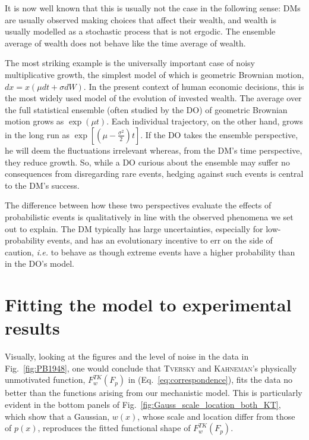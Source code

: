 \documentclass[a4paper, 12pt]{article}
\newcommand{\person}[1]{\textsc{#1}\xspace}
\newcommand{\eref}[1]{(Eq.~\ref{eq:#1})}
\newcommand{\fref}[1]{Fig.~\ref{fig:#1}}
\newcommand{\seclabel}[1]{\label{sec:#1}}
\newcommand{\ie}{\textit{i.e.}\xspace}
\begin{document}
It is now well known that this is usually not the case in the following sense: DMs are usually observed making choices that affect their wealth, and wealth is usually modelled as a stochastic process that is not ergodic. The ensemble average of wealth does not behave like the time average of wealth.

The most striking example is the universally important case of noisy multiplicative growth, the simplest model of which is geometric Brownian motion, $dx=x(\mu dt+\sigma dW)$. In the present context of human economic decisions, this is the most widely used model of the evolution of invested wealth. The average over the full statistical ensemble (often studied by the DO) of geometric Brownian motion grows as $\exp(\mu t)$. Each individual trajectory, on the other hand, grows in the long run as $\exp[(\mu-\frac{\sigma^2}{2})t]$. If the DO takes the ensemble perspective, he will deem the fluctuations irrelevant whereas, from the DM's time perspective, they reduce growth. So, while a DO curious about the ensemble may suffer no consequences from disregarding rare events, hedging against such events is central to the DM's success.

The difference between how these two perspectives evaluate the effects of probabilistic events is qualitatively in line with the observed phenomena we set out to explain. The DM typically has large uncertainties, especially for low-probability events, and has an evolutionary incentive to err on the side of caution, \ie to behave as though extreme events have a higher probability than in the DO's model.

\section{Fitting the model to experimental results \seclabel{Fitting_the}}
Visually, looking at the figures and the level of noise in the data in \fref{PB1948}, one would conclude that \person{Tversky} and \person{Kahneman}'s physically unmotivated function, $F^{TK}_w(F_p)$ in \eref{correspondence}, fits the data no better than the functions arising from our mechanistic model. This is particularly evident in the bottom panels of \fref{Gauss_scale_location_both_KT}, which show that a Gaussian, $w(x)$, whose scale and location differ from those of $p(x)$, reproduces the fitted functional shape of $F^{TK}_w(F_p)$.
\end{document}
